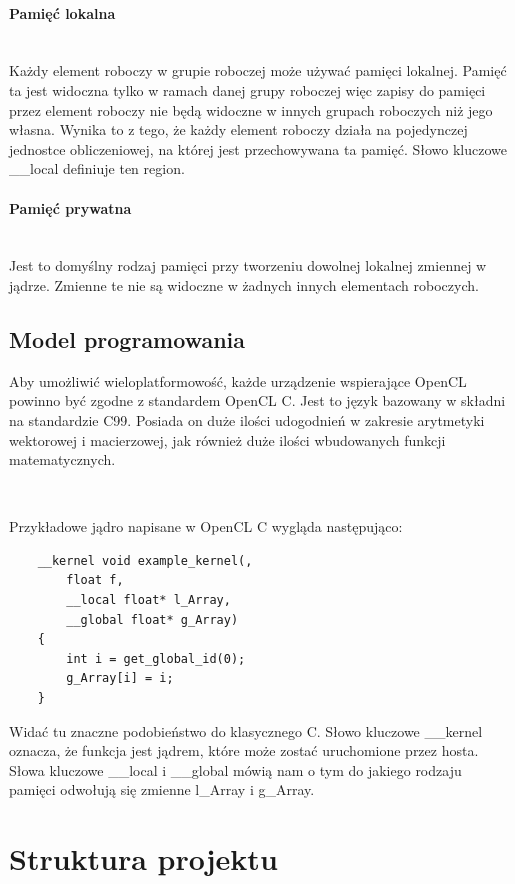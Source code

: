 \documentclass[polish, 12pt]{aghthesis}
\begin{document}
	\paragraph{Pamięć lokalna}\ \\
		Każdy element roboczy w grupie roboczej może używać pamięci lokalnej. Pamięć ta jest widoczna tylko w ramach danej grupy roboczej więc zapisy do pamięci przez element roboczy nie będą widoczne w innych grupach roboczych niż jego własna. Wynika to z tego, że każdy element roboczy działa na pojedynczej jednostce obliczeniowej, na której jest przechowywana ta pamięć. Słowo kluczowe \_\_local definiuje ten region.
	\paragraph{Pamięć prywatna}\ \\
		Jest to domyślny rodzaj pamięci przy tworzeniu dowolnej lokalnej zmiennej w jądrze. Zmienne te nie są widoczne w żadnych innych elementach roboczych.
	
	\subsection{Model programowania}
	Aby umożliwić wieloplatformowość, każde urządzenie wspierające OpenCL powinno być zgodne z standardem OpenCL C. Jest to język bazowany w składni na standardzie C99. Posiada on duże ilości udogodnień w zakresie arytmetyki wektorowej i macierzowej, jak również duże ilości wbudowanych funkcji matematycznych.
	
	$\,$
	
	Przykładowe jądro napisane w OpenCL C wygląda następująco:
	
	\begin{lstlisting}
	__kernel void example_kernel(,
		float f,
		__local float* l_Array,
		__global float* g_Array)
	{
		int i = get_global_id(0);
		g_Array[i] = i;
	}
	\end{lstlisting}
	
	Widać tu znaczne podobieństwo do klasycznego C. Słowo kluczowe \_\_kernel oznacza, że funkcja jest jądrem, które może zostać uruchomione przez hosta. Słowa kluczowe \_\_local i \_\_global mówią nam o tym do jakiego rodzaju pamięci odwołują się zmienne l\_Array i g\_Array.

\section{Struktura projektu}
\end{document}
